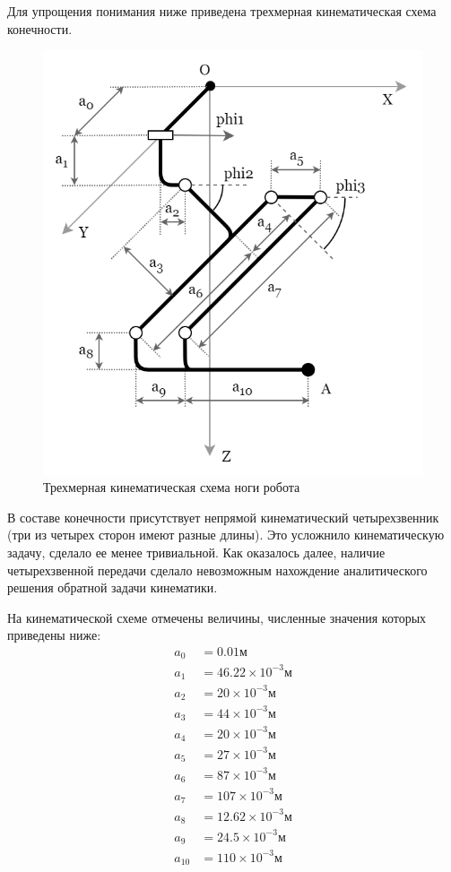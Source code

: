Для упрощения понимания ниже приведена трехмерная кинематическая схема конечности.
\begin{figure}[h]
    \centering
    \includegraphics[scale=0.5]{chapter_kinematics/figure1.png}
    \caption{Трехмерная кинематическая схема ноги робота}
    \label{}
\end{figure}

В составе конечности присутствует непрямой кинематический четырехзвенник (три из четырех сторон имеют разные длины). Это усложнило кинематическую задачу, сделало ее менее тривиальной. Как оказалось далее, наличие четырехзвенной передачи сделало невозможным нахождение аналитического решения обратной задачи кинематики. 

На кинематической схеме отмечены величины, численные значения которых приведены ниже:
\begin{align*}
    a_0&=0.01 м \\
    a_1&=46.22 \times 10^{-3} м \\
    a_2&=20 \times 10^{-3} м \\
    a_3&=44 \times 10^{-3} м \\
    a_4&=20 \times 10^{-3} м \\
    a_5&=27 \times 10^{-3} м \\
    a_6&=87 \times 10^{-3} м \\
    a_7&=107 \times 10^{-3} м \\
    a_8&=12.62 \times 10^{-3} м \\
    a_9&=24.5 \times 10^{-3} м \\
    a_10&=110 \times 10^{-3} м
\end{align*}

